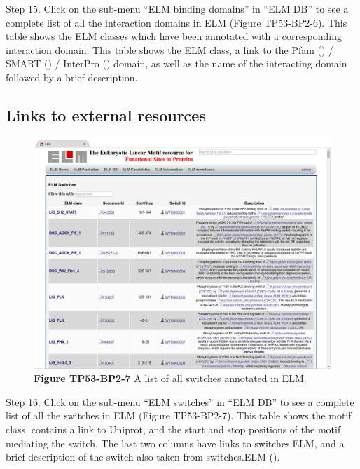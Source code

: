Step 15. Click on the sub-menu ``ELM binding domains'' in ``ELM DB'' to
see a complete list of all the interaction domains in ELM (Figure
TP53-BP2-6). This table shows the ELM classes which have been annotated
with a corresponding interaction domain. This table shows the ELM class,
a link to the Pfam (\cite{26673716}) / SMART (\cite{25300481}) /
InterPro (\cite{27899635}) domain, as well as the name of the
interacting domain followed by a brief description.


\subsection{Links to external
resources}\label{links-to-external-resources}

\begin{figure}[h!]
\centering
\includegraphics[width=\textwidth]{Figures/TP53_2/switches.png} 
\caption{
\textbf{Figure TP53-BP2-7}
A list of all switches annotated in ELM.
}
\end{figure}

Step 16. Click on the sub-menu ``ELM switches'' in ``ELM DB'' to see a
complete list of all the switches in ELM (Figure TP53-BP2-7). This table
shows the motif class, contains a link to Uniprot, and the start and
stop positions of the motif mediating the switch. The last two columns
have links to switches.ELM, and a brief description of the switch also
taken from switches.ELM (\cite{23550212}).

